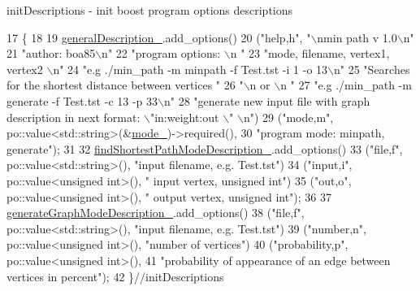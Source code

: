 init\+Descriptions -\/ init boost program options descriptions 


\begin{DoxyCode}
17                                               \{
18 
19             \hyperlink{a00002_a1fa87430e08e605b208fd532e73ac236_a1fa87430e08e605b208fd532e73ac236}{generalDescription\_}.add\_options()
20                     (\textcolor{stringliteral}{"help,h"}, \textcolor{stringliteral}{"\(\backslash\)nmin path v 1.0\(\backslash\)n"}
21                             \textcolor{stringliteral}{"author: boa85\(\backslash\)n"}
22                             \textcolor{stringliteral}{"program options: \(\backslash\)n "}
23                             \textcolor{stringliteral}{"mode, filename, vertex1, vertex2 \(\backslash\)n"}
24                             \textcolor{stringliteral}{"e.g ./min\_path -m minpath -f Test.tst  -i 1 -o 13\(\backslash\)n"}
25                             \textcolor{stringliteral}{"Searches for the shortest distance between vertices  "}
26                             \textcolor{stringliteral}{"\(\backslash\)n or \(\backslash\)n "}
27                             \textcolor{stringliteral}{"e.g ./min\_path -m generate -f Test.tst  -c 13 -p 33\(\backslash\)n"}
28                             \textcolor{stringliteral}{"generate new input file with graph description in next format: \(\backslash\)"in:weight:out
      \(\backslash\)" \(\backslash\)n"})
29                     (\textcolor{stringliteral}{"mode,m"}, po::value<std::string>(&\hyperlink{a00002_ad8127feed7d8312f07ef9a52f6e06f03_ad8127feed7d8312f07ef9a52f6e06f03}{mode\_})->required(),
30                      \textcolor{stringliteral}{"program mode: minpath, generate"});
31 
32             \hyperlink{a00002_a6ed91e0b976c665765f35aa51fefba87_a6ed91e0b976c665765f35aa51fefba87}{findShortestPathModeDescription\_}.add\_options()
33                     (\textcolor{stringliteral}{"file,f"}, po::value<std::string>(), \textcolor{stringliteral}{"input filename, e.g. Test.tst"})
34                     (\textcolor{stringliteral}{"input,i"}, po::value<unsigned int>(), \textcolor{stringliteral}{" input vertex, unsigned int"})
35                     (\textcolor{stringliteral}{"out,o"}, po::value<unsigned int>(), \textcolor{stringliteral}{" output vertex, unsigned int"});
36 
37             \hyperlink{a00002_aaa15954a88f93131e4c17223eafc11c5_aaa15954a88f93131e4c17223eafc11c5}{generateGraphModeDescription\_}.add\_options()
38                     (\textcolor{stringliteral}{"file,f"}, po::value<std::string>(), \textcolor{stringliteral}{"input filename, e.g. Test.tst"})
39                     (\textcolor{stringliteral}{"number,n"}, po::value<unsigned int>(), \textcolor{stringliteral}{"number of vertices"})
40                     (\textcolor{stringliteral}{"probability,p"}, po::value<unsigned int>(),
41                      \textcolor{stringliteral}{"probability of appearance of an edge between vertices in percent"});
42         \}\textcolor{comment}{//initDescriptions}
\end{DoxyCode}
